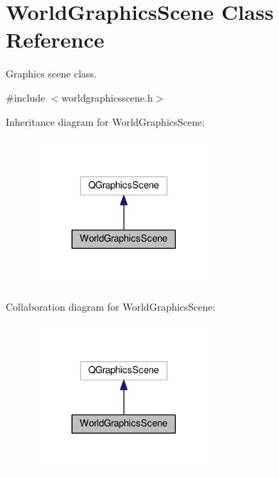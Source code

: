 \hypertarget{classWorldGraphicsScene}{}\section{World\+Graphics\+Scene Class Reference}
\label{classWorldGraphicsScene}


Graphics scene class.  




{\ttfamily \#include $<$worldgraphicsscene.\+h$>$}



Inheritance diagram for World\+Graphics\+Scene\+:\nopagebreak
\begin{figure}[H]
\begin{center}
\leavevmode
\includegraphics[width=189pt]{de/d1b/classWorldGraphicsScene__inherit__graph}
\end{center}
\end{figure}


Collaboration diagram for World\+Graphics\+Scene\+:\nopagebreak
\begin{figure}[H]
\begin{center}
\leavevmode
\includegraphics[width=189pt]{db/dee/classWorldGraphicsScene__coll__graph}
\end{center}
\end{figure}
